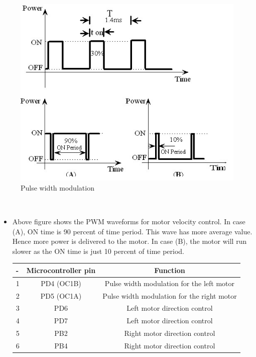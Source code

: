 \documentclass[a4paper,12pt,oneside]{book}
\begin{document}
	\hfill\\
	\begin{figure}[h!]
		\caption{Pulse width modulation}
		\includegraphics[width=\textwidth]{./HardwareManual/pwm.png}
	\end{figure}

	\hfill\\
	\begin{itemize}
	\item {Above figure shows the PWM waveforms for motor velocity control. In case (A), ON time is 90 percent of time period. This wave has more average value. Hence more power is delivered to the
	motor. In case (B), the motor will run slower as the ON time is just 10 percent of time period.}

	\begin{tabular*}{\textwidth}{|l|c|c|}
	\hline
	- & Microcontroller pin & Function \\
	\hline
	1 & PD4 (OC1B) & Pulse width modulation for the left motor\\
	\hline
	2 & PD5 (OC1A) & Pulse width modulation for the right motor\\
	\hline
	3 & PD6 & Left motor direction control \\
	\hline
	4 & PD7 & Left motor direction control \\
	\hline
	5 & PB2 & Right motor direction control \\
	\hline
	6 & PB4 & Right motor direction control \\
	\hline
	\end{tabular*}

	\end{itemize}
\end{document}

